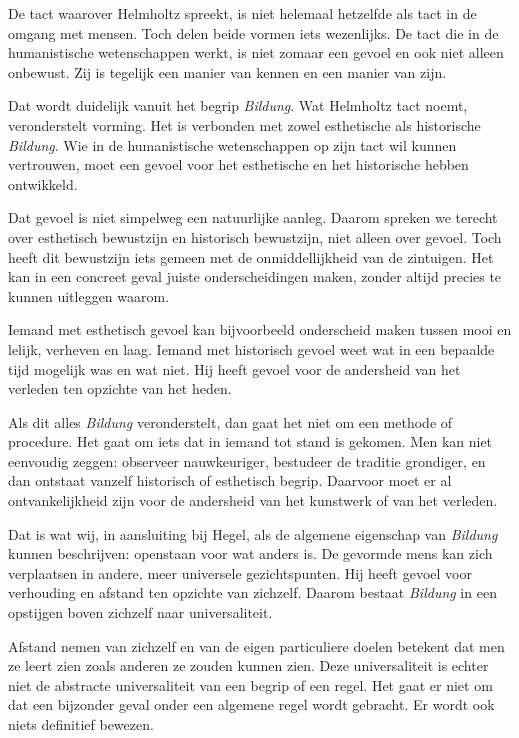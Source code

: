 De tact waarover Helmholtz spreekt, is niet helemaal hetzelfde als tact in de omgang met mensen. Toch delen beide vormen iets wezenlijks. De tact die in de humanistische wetenschappen werkt, is niet zomaar een gevoel en ook niet alleen onbewust. Zij is tegelijk een manier van kennen en een manier van zijn.

Dat wordt duidelijk vanuit het begrip \textit{Bildung}. Wat Helmholtz tact noemt, veronderstelt vorming. Het is verbonden met zowel esthetische als historische \textit{Bildung}. Wie in de humanistische wetenschappen op zijn tact wil kunnen vertrouwen, moet een gevoel voor het esthetische en het historische hebben ontwikkeld.

Dat gevoel is niet simpelweg een natuurlijke aanleg. Daarom spreken we terecht over esthetisch bewustzijn en historisch bewustzijn, niet alleen over gevoel. Toch heeft dit bewustzijn iets gemeen met de onmiddellijkheid van de zintuigen. Het kan in een concreet geval juiste onderscheidingen maken, zonder altijd precies te kunnen uitleggen waarom.

Iemand met esthetisch gevoel kan bijvoorbeeld onderscheid maken tussen mooi en lelijk, verheven en laag. Iemand met historisch gevoel weet wat in een bepaalde tijd mogelijk was en wat niet. Hij heeft gevoel voor de andersheid van het verleden ten opzichte van het heden.

Als dit alles \textit{Bildung} veronderstelt, dan gaat het niet om een methode of procedure. Het gaat om iets dat in iemand tot stand is gekomen. Men kan niet eenvoudig zeggen: observeer nauwkeuriger, bestudeer de traditie grondiger, en dan ontstaat vanzelf historisch of esthetisch begrip. Daarvoor moet er al ontvankelijkheid zijn voor de andersheid van het kunstwerk of van het verleden.

Dat is wat wij, in aansluiting bij Hegel, als de algemene eigenschap van \textit{Bildung} kunnen beschrijven: openstaan voor wat anders is. De gevormde mens kan zich verplaatsen in andere, meer universele gezichtspunten. Hij heeft gevoel voor verhouding en afstand ten opzichte van zichzelf. Daarom bestaat \textit{Bildung} in een opstijgen boven zichzelf naar universaliteit.

Afstand nemen van zichzelf en van de eigen particuliere doelen betekent dat men ze leert zien zoals anderen ze zouden kunnen zien. Deze universaliteit is echter niet de abstracte universaliteit van een begrip of een regel. Het gaat er niet om dat een bijzonder geval onder een algemene regel wordt gebracht. Er wordt ook niets definitief bewezen.

